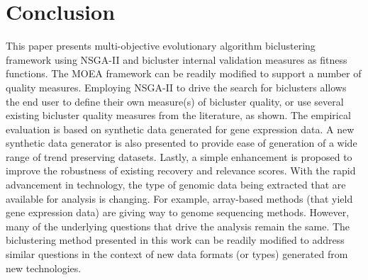 \section{Conclusion}
This paper presents multi-objective evolutionary algorithm biclustering framework using NSGA-II and bicluster internal validation measures as fitness functions.
The MOEA framework can be readily modified to support a number of quality measures. Employing NSGA-II to drive the search for biclusters allows the end user to define their own measure(s) of bicluster quality, or use several existing bicluster quality measures from the literature, as shown.
The empirical evaluation is based on synthetic data generated for gene expression data. A new synthetic data generator is also presented to provide ease of generation of a wide range of trend preserving datasets.
Lastly, a simple enhancement is proposed to improve the robustness of existing recovery and relevance scores.
With the rapid advancement in technology, the type of genomic data being extracted that are available for analysis is changing. For example, array-based methods (that yield gene expression data) are giving way to genome sequencing methods. However, many of the underlying questions that drive the analysis remain the same. The biclustering method presented in this work can be readily modified to address similar questions in the context of new data formats (or types) generated from new technologies. 

